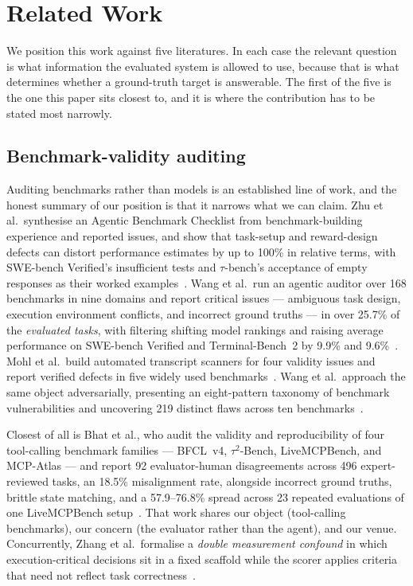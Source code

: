 \documentclass[11pt]{article}
\begin{document}
\section{Related Work}
\label{sec:related}

We position this work against five literatures. In each case the relevant
question is what information the evaluated system is allowed to use, because
that is what determines whether a ground-truth target is answerable. The first
of the five is the one this paper sits closest to, and it is where the
contribution has to be stated most narrowly.

\subsection{Benchmark-validity auditing}
\label{sec:validity}

Auditing benchmarks rather than models is an established line of work, and the
honest summary of our position is that it narrows what we can claim. Zhu
et al.\ synthesise an Agentic Benchmark Checklist from benchmark-building
experience and reported issues, and show that task-setup and reward-design
defects can distort performance estimates by up to 100\% in relative terms,
with SWE-bench Verified's insufficient tests and $\tau$-bench's acceptance of
empty responses as their worked examples~\cite{zhu2025abc}. Wang et al.\ run an
agentic auditor over 168 benchmarks in nine domains and report critical issues
--- ambiguous task design, execution environment conflicts, and incorrect
ground truths --- in over 25.7\% of the \emph{evaluated tasks}, with filtering
shifting model rankings and raising average performance on SWE-bench Verified
and Terminal-Bench~2 by 9.9\% and 9.6\%~\cite{wang2026autoaudit}. Mohl et al.\ build automated transcript
scanners for four validity issues and report verified defects in five widely
used benchmarks~\cite{mohl2026transcript}. Wang et al.\ approach the same
object adversarially, presenting an eight-pattern taxonomy of benchmark
vulnerabilities and uncovering 219 distinct flaws across ten
benchmarks~\cite{wang2026benchjack}.

Closest of all is Bhat et al., who audit the validity and reproducibility of
four tool-calling benchmark families --- BFCL~v4, $\tau^2$-Bench, LiveMCPBench,
and MCP-Atlas --- and report 92 evaluator-human disagreements across 496
expert-reviewed tasks, an 18.5\% misalignment rate, alongside incorrect ground
truths, brittle state matching, and a 57.9--76.8\% spread across 23 repeated
evaluations of one LiveMCPBench setup~\cite{bhat2026benchmarking}. That work
shares our object (tool-calling benchmarks), our concern (the evaluator rather
than the agent), and our venue. Concurrently, Zhang et al.\ formalise a
\emph{double measurement confound} in which execution-critical decisions sit in
a fixed scaffold while the scorer applies criteria that need not reflect task
correctness~\cite{zhang2026doubleconfound}.
\end{document}
